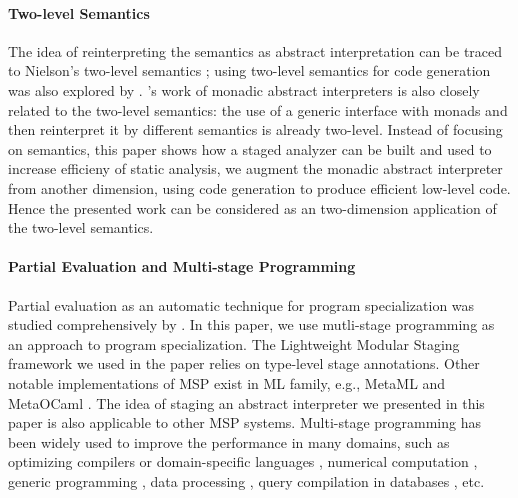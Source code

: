 \paragraph{Two-level Semantics} The idea of reinterpreting the semantics as
abstract interpretation can be traced to Nielson's two-level semantics
\cite{NIELSON1989117}; using two-level semantics for code generation
was also explored by \citet{NIELSON198859}.
\citet{Sergey:2013:MAI:2491956.2491979}'s work of monadic abstract
interpreters is also closely related to the two-level semantics: the
use of a generic interface with monads and then reinterpret it by
different semantics is already two-level. Instead of focusing on
semantics, this paper shows how a staged analyzer can be built and
used to increase efficieny of static analysis, we augment the monadic
abstract interpreter from another dimension, using code generation to
produce efficient low-level code. Hence the presented work can be
considered as an two-dimension application of the two-level semantics.

\paragraph{Partial Evaluation and Multi-stage Programming}
Partial evaluation as an automatic technique for program
specialization was studied comprehensively by
\citet{10.1007/3-540-61580-6_11, DBLP:books/daglib/0072559}.  In this
paper, we use mutli-stage programming as an approach to program
specialization. The Lightweight Modular Staging framework
\cite{DBLP:conf/gpce/RompfO10} we used in the paper relies on
type-level stage annotations.  Other notable implementations of MSP
exist in ML family, e.g., MetaML \cite{DBLP:conf/pepm/TahaS97} and
MetaOCaml \cite{DBLP:conf/gpce/CalcagnoTHL03,
  DBLP:conf/flops/Kiselyov14}.  The idea of staging an abstract
interpreter we presented in this paper is also applicable to other MSP
systems.  Multi-stage programming has been widely used to improve the
performance in many domains, such as optimizing compilers or
domain-specific languages \cite{DBLP:conf/pldi/RompfSBLCO14,
  DBLP:conf/snapl/RompfBLSJAOSKDK15,
  DBLP:journals/tecs/SujeethBLRCOO14, DBLP:conf/gpce/SujeethGBLROO13,
  DBLP:journals/jfp/CaretteKS09}, numerical computation \cite{PGL-038,
  DBLP:conf/pepm/AktemurKKS13}, generic programming
\cite{DBLP:journals/pacmpl/Yallop17,
  Ofenbeck:2017:SGP:3136040.3136060}, data processing
\cite{DBLP:conf/oopsla/JonnalageddaCSRO14,
  DBLP:conf/popl/KiselyovBPS17}, query compilation in databases
\cite{DBLP:conf/osdi/EssertelTDBOR18, DBLP:conf/sigmod/TahboubER18},
etc.

